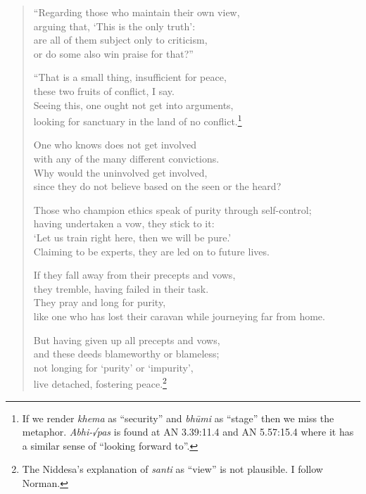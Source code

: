 \documentclass[12pt,openany]{book}%
\begin{document}
\begin{verse}%
“Regarding those who maintain their own view, \\
arguing that, ‘This is the only truth’: \\
are all of them subject only to criticism, \\
or do some also win praise for that?” 

“That is a small thing, insufficient for peace, \\
these two fruits of conflict, I say. \\
Seeing this, one ought not get into arguments, \\
looking for sanctuary in the land of no conflict.\footnote{If we render \textit{khema} as “security” and \textit{\textsanskrit{bhūmi}} as “stage” then we miss the metaphor. \textit{Abhi-√pas} is found at AN 3.39:11.4 and AN 5.57:15.4 where it has a similar sense of “looking forward to”. } 

One who knows does not get involved \\
with any of the many different convictions. \\
Why would the uninvolved get involved, \\
since they do not believe based on the seen or the heard? 

Those who champion ethics speak of purity through self-control; \\
having undertaken a vow, they stick to it: \\
‘Let us train right here, then we will be pure.’ \\
Claiming to be experts, they are led on to future lives. 

If they fall away from their precepts and vows, \\
they tremble, having failed in their task. \\
They pray and long for purity, \\
like one who has lost their caravan while journeying far from home. 

But having given up all precepts and vows, \\
and these deeds blameworthy or blameless; \\
not longing for ‘purity’ or ‘impurity’, \\
live detached, fostering peace.\footnote{The Niddesa’s explanation of \textit{santi} as “view” is not plausible. I follow Norman. } 


\end{verse}
\end{document}
